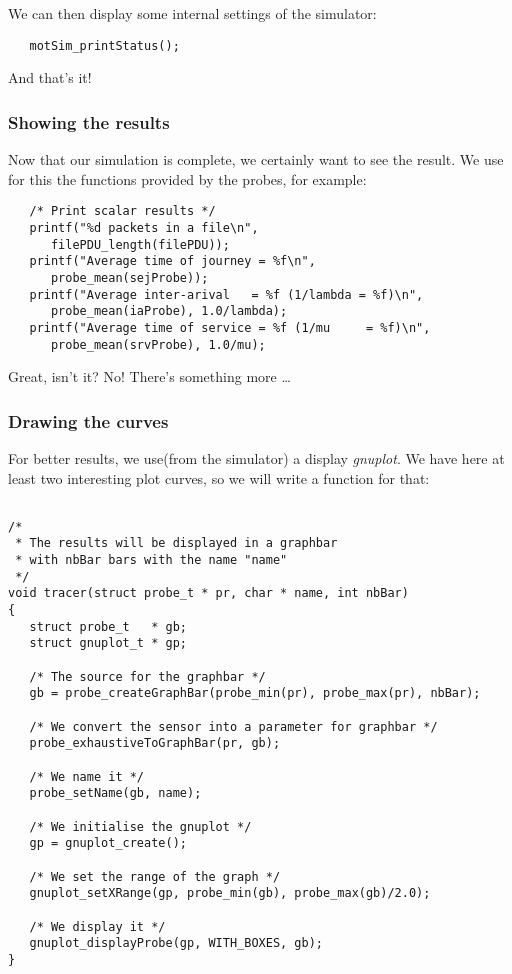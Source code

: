    We can then display some internal settings of the simulator:

\begin{verbatim}
   motSim_printStatus();
\end{verbatim}

   And that's it!

%
\subsubsection{Showing the results}
  
   Now that our simulation is complete, we certainly
want to see the result. We use for this the functions
provided by the probes, for example:  


\begin{verbatim}
   /* Print scalar results */
   printf("%d packets in a file\n",
	  filePDU_length(filePDU));
   printf("Average time of journey = %f\n",
	  probe_mean(sejProbe));
   printf("Average inter-arival   = %f (1/lambda = %f)\n",
	  probe_mean(iaProbe), 1.0/lambda);
   printf("Average time of service = %f (1/mu     = %f)\n",
	  probe_mean(srvProbe), 1.0/mu);
\end{verbatim}

   Great, isn't it? No! There's something more \ldots

%
\subsubsection{Drawing the curves}

   
   For better results, we use(from the simulator) a display {\em gnuplot}. We have here at least two interesting plot curves, so we will write a
function for that:

\begin{verbatim}

/*
 * The results will be displayed in a graphbar
 * with nbBar bars with the name "name"
 */
void tracer(struct probe_t * pr, char * name, int nbBar)
{
   struct probe_t   * gb;
   struct gnuplot_t * gp;

   /* The source for the graphbar */
   gb = probe_createGraphBar(probe_min(pr), probe_max(pr), nbBar);

   /* We convert the sensor into a parameter for graphbar */
   probe_exhaustiveToGraphBar(pr, gb);

   /* We name it */
   probe_setName(gb, name);

   /* We initialise the gnuplot */
   gp = gnuplot_create();

   /* We set the range of the graph */
   gnuplot_setXRange(gp, probe_min(gb), probe_max(gb)/2.0);

   /* We display it */
   gnuplot_displayProbe(gp, WITH_BOXES, gb);
}
\end{verbatim}

